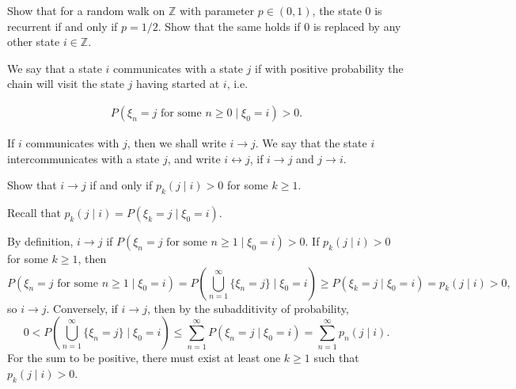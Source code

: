 \begin{Theorem}
\label{thrm:random-walk-recurrent}
Show that for a random walk on $\mathbb{Z}$ with parameter $p\in(0,1)$, the state 0 is recurrent if and only if $p = 1/2$. Show that the same holds if 0 is replaced by any other state $i\in\mathbb{Z}$.
\end{Theorem}

\begin{Definition}
\label{def:communicates}
We say that a state $i$ communicates with a state $j$ if with positive probability the chain will visit the state $j$ having started at $i$, i.e.

\begin{align}
P(\xi_n = j \text{ for some } n \geq 0 \mid \xi_0 = i) > 0. \tag{5.37}
\end{align}

If $i$ communicates with $j$, then we shall write $i \to j$. We say that the state $i$ intercommunicates with a state $j$, and write $i \leftrightarrow j$, if $i \to j$ and $j \to i$.
\end{Definition}

\begin{Exercise}
\label{exr:communicates-pn}
Show that $i \to j$ if and only if $p_k(j \mid i) > 0$ for some $k \geq 1$.

\begin{hint}
Recall that $p_k(j \mid i) = P(\xi_k = j \mid \xi_0 = i)$.
\end{hint}
\end{Exercise}

\begin{Solution}
By definition, $i \to j$ if $P(\xi_n = j \text{ for some } n \geq 1 \mid \xi_0 = i) > 0$.
If $p_k(j \mid i) > 0$ for some $k \geq 1$, then
\[
P(\xi_n = j \text{ for some } n \geq 1 \mid \xi_0 = i) = P\left( \bigcup_{n=1}^\infty \{ \xi_n = j \} \mid \xi_0 = i \right) \geq P(\xi_k = j \mid \xi_0 = i) = p_k(j \mid i) > 0,
\]
so $i \to j$.
Conversely, if $i \to j$, then by the subadditivity of probability,
\[
0 < P\left( \bigcup_{n=1}^\infty \{ \xi_n = j \} \mid \xi_0 = i \right) \leq \sum_{n=1}^\infty P(\xi_n = j \mid \xi_0 = i) = \sum_{n=1}^\infty p_n(j \mid i).
\]
For the sum to be positive, there must exist at least one $k \geq 1$ such that $p_k(j \mid i) > 0$.
\end{Solution}

